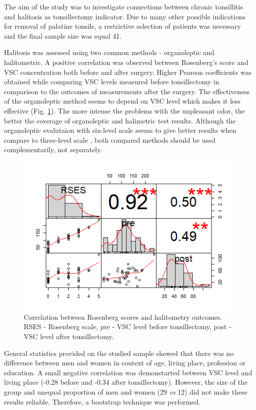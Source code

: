 \documentclass[12pt,a4paper,notitlepage]{report}
\begin{document}
The aim of the study was to investigate connections between chronic tonsillitis and halitosis as tonsillectomy indicator. 
Due to many other possible indications for removal of palatine tonsils, a restrictive selection of patients was necessary and the final sample size was equal 41.

Halitosis was assessed using two common methods - organoleptic and halitometric. A positive correlation was observed between Rosenberg's score and VSC concentration both before and after surgery. Higher Pearson coefficients was obtained while comparing VSC levels measured before tonsillectomy in comparison to the outcomes of measurements after the surgery. The effectiveness of the organoleptic method seems to depend on VSC level which makes it less effective (Fig. {\ref{fig:RSES_correlation}}). The more intense the problems with the unpleasant odor, the better the coverage of organoleptic and halimetric test results. Although the organoleptic evalutaion with six-level scale seems to give better results when compare to three-level scale \cite{MesquitaGuimaraes17}, both compared methods should be used complementarily, not separately.

\begin{figure}[H]
	\centering
	\includegraphics[width=0.7\columnwidth]{./Figures/RSES_correlation}
	\caption{Correlation between Rosenberg scores and halitometry outcomes. RSES - Rosenberg scale, pre - VSC level before tonsillectomy, post - VSC level after tonsillectomy.}
	\label{fig:RSES_correlation}
\end{figure}	

General statistics provided on the studied sample showed that there was no difference between men and women in context of age, living place, profession or education. A small negative correlation was demonstarted between VSC level and living place (-0.28 before and -0.34 after tonsillectomy). However, the size of the group and unequal proportion of men and women (29 \textit{vs} 12) did not make these results reliable. Therefore, a bootstrap technique was performed.
\end{document}
